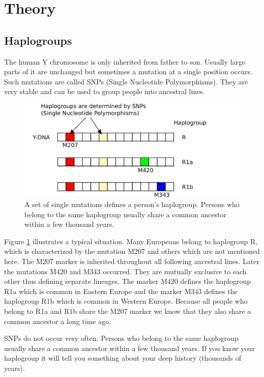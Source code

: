 \section{Theory}

\subsection{Haplogroups}

The human Y chromosome is only inherited from father to
son. Usually large parts of it are unchanged but sometimes
a mutation at a single position occurs. Such mutations are
called SNPs (Single Nucleotide Polymorphisms). They are
very stable and can be used to group people into ancestral
lines.

\begin{figure}[ht]
\centering
\includegraphics[width=13cm]{img/haplogroups.png}
\caption{\label{haplogroup} A set of single mutations
defines a person's haplogroup. Persons who belong to the
same haplogroup usually share a common ancestor within a
few thousand years.}
\end{figure}

Figure \ref{haplogroup} illustrates a typical situation.
Many Europeans belong to haplogroup R, which is characterized
by the mutation M207 and others which are not mentioned here.
The M207 marker is inherited throughout all following ancestral
lines. Later the mutations M420 and M343 occurred. They are
mutually exclusive to each other thus defining separate
lineages. The marker M420 defines the haplogroup R1a which
is common in Eastern Europe and the marker M343 defines the
haplogroup R1b which is common in Western Europe. Because
all people who belong to R1a and R1b share the M207 marker
we know that they also share a common ancestor a long time
ago.

SNPs do not occur very often. Persons who belong to the
same haplogroup usually share a common ancestor within a
few thousand years. If you know your haplogroup it will
tell you something about your deep history (thousands
of years).


